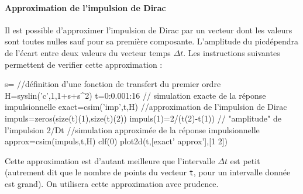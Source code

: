 \paragraph{Approximation de l'impulsion de Dirac}
Il est possible d'approximer l'impulsion de Dirac par un vecteur dont
les valeurs sont toutes nulles sauf pour sa première composante. 
L'amplitude du \og pic\fg dépendra de l'écart entre deux valeurs du vecteur 
temps $\Delta t$.
Les instructions suivantes permettent de verifier cette approximation :
\begin{Scilabcode}
s=%
//définition d'une fonction de transfert du premier ordre
H=syslin('c',1,1+s+s^2)
t=0:0.001:16
// simulation exacte de la réponse impulsionnelle
exact=csim('imp',t,H)
//approximation de l'impulsion de Dirac
impuls=zeros(size(t)(1),size(t)(2))
impuls(1)=2/(t(2)-t(1))  // "amplitude" de l'impulsion 2/Dt  
//simulation approximée de la réponse impulsionnelle
approx=csim(impuls,t,H)
clf(0)
plot2d(t,[exact' approx'],[1 2])
\end{Scilabcode}
Cette approximation est d'autant meilleure que l'intervalle $\Delta t$ est 
petit (autrement dit que le nombre de points du vecteur \verb?t?, pour un 
intervalle donnée est grand). On utilisera cette approximation avec prudence.
